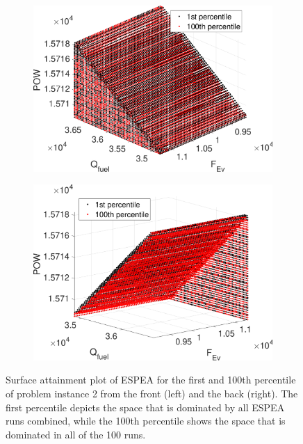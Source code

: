 \begin{figure}
	\begin{subfigure}{0.47\textwidth}
	\includegraphics[width=\textwidth]{figures/safront_cropped.pdf}
	\end{subfigure}
\hfill
	\begin{subfigure}{0.47\textwidth}
	\includegraphics[width=\textwidth]{figures/saback_cropped.pdf}
	\end{subfigure}
\caption{Surface attainment plot of ESPEA for the first and 100th percentile of problem instance 2 from the front (left) and the back (right). The first percentile depicts the space that is dominated by all ESPEA runs combined, while the 100th percentile shows the space that is dominated in all of the 100 runs.}
\label{fig:surfaceattainment}
\end{figure}

